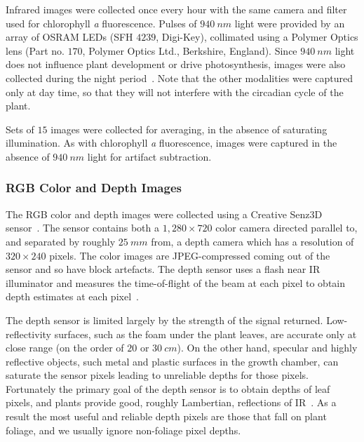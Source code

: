 Infrared images were collected once every hour with the same camera and filter used for chlorophyll {\it a} fluorescence.
Pulses of $940~nm$ light were provided by an array of OSRAM LEDs (SFH $4239$, Digi-Key), collimated using a Polymer Optics lens (Part no. $170$, Polymer Optics Ltd., Berkshire, England).
Since $940~nm$ light does not influence plant development or drive photosynthesis, images were also collected during the night period~\cite{eskins1992light}.
Note that the other modalities were captured only at day time, so that they will not interfere with the circadian cycle of the plant.

Sets of $15$ images were collected for averaging, in the absence of saturating illumination.
As with chlorophyll {\it a} fluorescence, images were captured in the absence of $940~nm$ light for artifact subtraction.



\subsubsection{RGB Color and Depth Images} %
The RGB color and depth images were collected using a Creative Senz3D sensor~\cite{nguyen2015vietnamese}.
The sensor contains both a $1,280 \times 720$ color camera directed parallel to, and separated by roughly $25~mm$ from, a depth camera which has a resolution of $320\times240$ pixels.  The color images are JPEG-compressed coming out of the sensor and so have block artefacts.  The depth sensor uses a flash near IR illuminator and measures the time-of-flight of the beam at each pixel to obtain depth estimates at each pixel~\cite{Hansard2013}.

The depth sensor is limited largely by the strength of the signal returned.  Low-reflectivity surfaces, such as the foam under the plant leaves, are accurate only at close range (on the order of $20$ or $30~cm$).  On the other hand, specular and highly reflective objects, such metal and plastic surfaces in the growth chamber, can saturate the sensor pixels leading to unreliable depths for those pixels.  Fortunately the primary goal of the depth sensor is to obtain depths of leaf pixels, and plants provide good, roughly Lambertian, reflections of IR~\cite{Chelle2006219}.  As a result the most useful and reliable depth pixels are those that fall on plant foliage, and we usually ignore non-foliage pixel depths.

